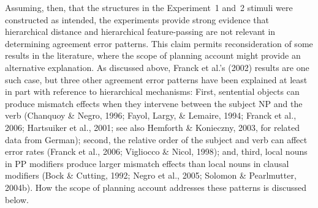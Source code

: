 \documentclass[12pt,titlepage]{article}
\newcommand{\IGNORE}[1]{} %
\begin{document}
\IGNORE{\subsection{Reconsideration of Hierarchical Feature-Passing Results}}

Assuming, then, that the structures in the Experiment~1 and~2 stimuli were
constructed as intended, the experiments provide strong evidence that
hierarchical distance and hierarchical feature-passing are not relevant in
determining agreement error patterns.  This claim permits reconsideration
of some results in the literature, where the scope of planning account
might provide an alternative explanation.  As discussed above, Franck et
al.'s (2002) results are one such case, but three other agreement error
patterns have been explained at least in part with reference to
hierarchical mechanisms: First, sentential objects can produce mismatch
effects when they intervene between the subject NP and the verb\IGNORE{,
but these effects are smaller than from a local noun in a PP modifying the
subject NP} (Chanquoy \& Negro, 1996; Fayol, Largy, \& Lemaire, 1994;
Franck et al., 2006; Hartsuiker et al., 2001; see also Hemforth \&
Konieczny, 2003, for related data from German); second, the relative order
of the subject and verb can affect error rates (Franck et al., 2006;
Vigliocco \& Nicol, 1998); and, third, local nouns in PP modifiers produce
larger mismatch effects than local nouns in clausal modifiers (Bock \&
Cutting, 1992; Negro et al., 2005; Solomon \& Pearlmutter, 2004b).  How the
scope of planning account addresses these patterns is discussed below.
\end{document}
